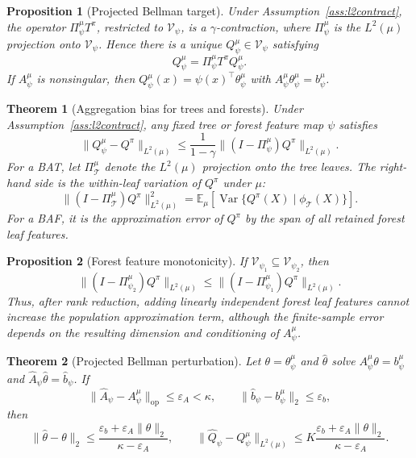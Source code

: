 \documentclass{article}
\newcommand{\E}{\mathbb{E}}
\newcommand{\cT}{\mathcal T}
\newcommand{\cV}{\mathcal V}
\newcommand{\hatA}{\widehat A}
\newcommand{\hatb}{\widehat b}
\newcommand{\proj}{\Pi}
\theoremstyle{plain}
\newtheorem{theorem}{Theorem}
\newtheorem{proposition}{Proposition}
\theoremstyle{definition}
\theoremstyle{remark}
\begin{document}
\begin{proposition}[Projected Bellman target]
\label{prop:projected}
Under Assumption~\ref{ass:l2contract}, the operator
\(\proj^\mu_\psi T^\pi\), restricted to \(\cV_\psi\), is a
\(\gamma\)-contraction, where \(\proj^\mu_\psi\) is the \(L^2(\mu)\) projection
onto \(\cV_\psi\). Hence there is a unique \(Q^\mu_\psi\in\cV_\psi\) satisfying
\[
  Q^\mu_\psi=\proj^\mu_\psi T^\pi Q^\mu_\psi .
\]
If \(A^\mu_\psi\) is nonsingular, then
\(Q^\mu_\psi(x)=\psi(x)^\top\theta^\mu_\psi\) with
\(A^\mu_\psi\theta^\mu_\psi=b^\mu_\psi\).
\end{proposition}

\begin{theorem}[Aggregation bias for trees and forests]
\label{thm:aggregation_bias}
Under Assumption~\ref{ass:l2contract}, any fixed tree or forest feature map
\(\psi\) satisfies
\[
  \|Q^\mu_\psi-Q^\pi\|_{L^2(\mu)}
  \le
  \frac{1}{1-\gamma}
  \|(I-\proj^\mu_\psi)Q^\pi\|_{L^2(\mu)}.
\]
For a BAT, let \(\proj^\mu_{\cT}\) denote the \(L^2(\mu)\) projection onto the
tree leaves. The right-hand side is the within-leaf variation of \(Q^\pi\)
under \(\mu\):
\[
  \|(I-\proj^\mu_{\cT})Q^\pi\|_{L^2(\mu)}^2
  =
  \E_\mu[\operatorname{Var}\{Q^\pi(X)\mid \phi_{\cT}(X)\}].
\]
For a BAF, it is the approximation error of \(Q^\pi\) by the span of all
retained forest leaf features.
\end{theorem}

\begin{proposition}[Forest feature monotonicity]
\label{prop:monotonicity}
If \(\cV_{\psi_1}\subseteq \cV_{\psi_2}\), then
\[
  \|(I-\proj^\mu_{\psi_2})Q^\pi\|_{L^2(\mu)}
  \le
  \|(I-\proj^\mu_{\psi_1})Q^\pi\|_{L^2(\mu)}.
\]
Thus, after rank reduction, adding linearly independent forest leaf features
cannot increase the population approximation term, although the finite-sample
error depends on the resulting dimension and conditioning of \(A^\mu_\psi\).
\end{proposition}

\begin{theorem}[Projected Bellman perturbation]
\label{thm:feature_perturbation}
Let \(\theta=\theta^\mu_\psi\) and \(\hat\theta\) solve
\(A^\mu_\psi\theta=b^\mu_\psi\) and
\(\hatA_\psi\hat\theta=\hatb_\psi\). If
\[
  \|\hatA_\psi-A^\mu_\psi\|_{\mathrm{op}}\le \varepsilon_A<\kappa,
  \qquad
  \|\hatb_\psi-b^\mu_\psi\|_2\le \varepsilon_b,
\]
then
\[
  \|\hat\theta-\theta\|_2
  \le
  \frac{\varepsilon_b+\varepsilon_A\|\theta\|_2}{\kappa-\varepsilon_A},
  \qquad
  \|\hat Q_\psi-Q^\mu_\psi\|_{L^2(\mu)}
  \le
  K\frac{\varepsilon_b+\varepsilon_A\|\theta\|_2}{\kappa-\varepsilon_A}.
\]
\end{theorem}
\end{document}
